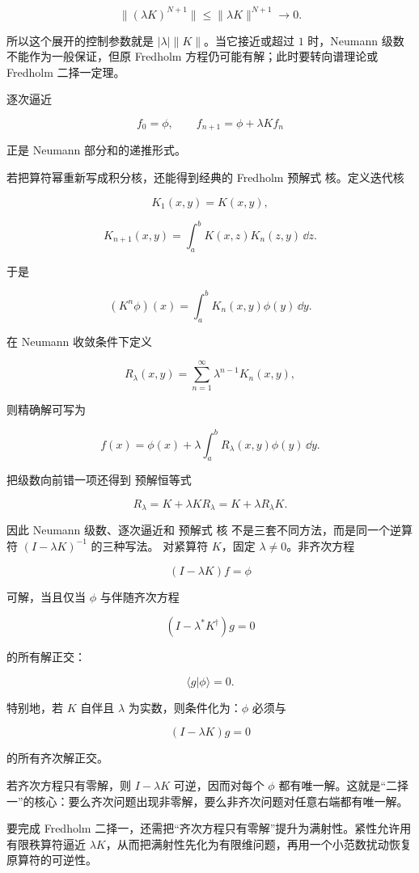 \[
\|(\lambda K)^{N+1}\|
\le\|\lambda K\|^{N+1}\to0.
\]

所以这个展开的控制参数就是 $|\lambda|\|K\|$。当它接近或超过 $1$ 时，Neumann 级数不能作为一般保证，但原 Fredholm 方程仍可能有解；此时要转向谱理论或 Fredholm 二择一定理。

逐次逼近

\[
f_0=\phi,\qquad f_{n+1}=\phi+\lambda Kf_n
\]

正是 Neumann 部分和的递推形式。

若把算符幂重新写成积分核，还能得到经典的 Fredholm 预解式 核。定义迭代核

\[
K_1(x,y)=K(x,y),
\]

\[
K_{n+1}(x,y)
=\int_a^bK(x,z)K_n(z,y)\,\dd z.
\]

于是

\[
(K^n\phi)(x)=\int_a^bK_n(x,y)\phi(y)\,\dd y.
\]

在 Neumann 收敛条件下定义

\[
R_\lambda(x,y)
=\sum_{n=1}^{\infty}\lambda^{n-1}K_n(x,y),
\]

则精确解可写为

\[
\boxed{
f(x)=\phi(x)+\lambda\int_a^bR_\lambda(x,y)\phi(y)\,\dd y
}.
\]

把级数向前错一项还得到 预解恒等式

\[
R_\lambda=K+\lambda KR_\lambda
=K+\lambda R_\lambda K.
\]

因此 Neumann 级数、逐次逼近和 预解式 核 不是三套不同方法，而是同一个逆算符 $(I-\lambda K)^{-1}$ 的三种写法。
对紧算符 $K$，固定 $\lambda\neq0$。非齐次方程

\[
(I-\lambda K)f=\phi
\]

可解，当且仅当 $\phi$ 与伴随齐次方程

\[
(I-\lambda^*K^\dagger)g=0
\]

的所有解正交：

\begin{equation*}\boxed{\langle g|\phi\rangle=0}.\end{equation*}

特别地，若 $K$ 自伴且 $\lambda$ 为实数，则条件化为：$\phi$ 必须与

\[
(I-\lambda K)g=0
\]

的所有齐次解正交。

若齐次方程只有零解，则 $I-\lambda K$ 可逆，因而对每个 $\phi$ 都有唯一解。这就是``二择一''的核心：要么齐次问题出现非零解，要么非齐次问题对任意右端都有唯一解。

要完成 Fredholm 二择一，还需把“齐次方程只有零解”提升为满射性。紧性允许用有限秩算符逼近 $\lambda K$，从而把满射性先化为有限维问题，再用一个小范数扰动恢复原算符的可逆性。

